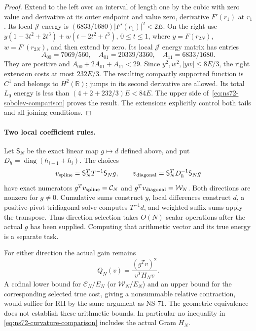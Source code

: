 \begin{proof}
Extend to the left over an interval of length one by the cubic with
zero value and derivative at its outer endpoint and value zero,
derivative $F'(r_1)$ at $r_1$. Its local $\mathcal J$ energy is
$(6833/1680)|F'(r_1)|^2<2E$.
On the right use $y(1-3t^2+2t^3)+w(t-2t^2+t^3)$,
$0\leq t\leq1$, where $y=F(r_{2N})$, $w=F'(r_{2N})$,
and then extend by zero. Its local $\mathcal J$ energy matrix has entries
\[
 A_{00}=7069/560,\quad A_{01}=20339/3360,\quad A_{11}=6833/1680.
\]
They are positive and $A_{00}+2A_{01}+A_{11}<29$.
Since $y^2,w^2,|yw|\leq8E/3$, the right extension costs at most
$232E/3$. The resulting compactly supported function is $C^1$
and belongs to $H^2(\mathbb R)$; jumps in its second derivative
are allowed. Its total $L_0$ energy is less than
$(4+2+232/3)E<84E$.
The upper side of~\eqref{eq:ns72-sobolev-comparison} proves the result.
The extensions explicitly control both tails and all joining conditions.
\end{proof}

\paragraph{Two local coefficient rules.}
Let $\mathsf S_N$ be the exact linear map $g\mapsto d$ defined above,
and put $D_h=\operatorname{diag}(h_{i-1}+h_i)$. The choices
\begin{equation}
 v_{\rm spline}=\mathsf S_N^TT^{-1}\mathsf S_Ng,
 \qquad v_{\rm diagonal}=\mathsf S_N^TD_h^{-1}\mathsf S_Ng
 \label{eq:ns72-local-directions}
\end{equation}
have exact numerators $g^Tv_{\rm spline}=\mathcal C_N$ and
$g^Tv_{\rm diagonal}=\mathcal W_N$.
Both directions are nonzero for $g\ne0$.
Cumulative sums construct $y$, local differences construct $d$, a
positive-pivot tridiagonal solve computes $T^{-1}d$, and weighted suffix
sums apply the transpose. Thus direction selection takes $O(N)$ scalar
operations after the actual $g$ has been supplied. Computing that
arithmetic vector and its true energy is a separate task.

For either direction the actual gain remains
\[
 Q_N(v)=\frac{(g^Tv)^2}{v^TH_Nv}.
\]
A cofinal lower bound for $\mathcal C_N/E_N$ (or $\mathcal W_N/E_N$)
and an upper bound for the corresponding selected true cost, giving a
nonsummable relative contraction, would suffice for RH by the same
argument as NS-71. The geometric equivalence does not establish these
arithmetic bounds. In particular no inequality in
\eqref{eq:ns72-curvature-comparison} includes the actual Gram $H_N$.

